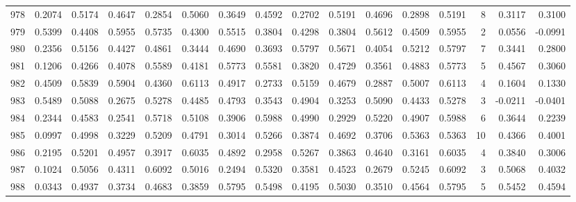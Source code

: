 \begin{tabular}{lrrrrrrrrrrrrrrr}
978 &      0.2074 &  0.5174 &  0.4647 &  0.2854 &  0.5060 &  0.3649 &  0.4592 &  0.2702 &  0.5191 &  0.4696 &   0.2898 &     0.5191 &      8 &                    0.3117 &                     0.3100 \\
979 &      0.5399 &  0.4408 &  0.5955 &  0.5735 &  0.4300 &  0.5515 &  0.3804 &  0.4298 &  0.3804 &  0.5612 &   0.4509 &     0.5955 &      2 &                    0.0556 &                    -0.0991 \\
980 &      0.2356 &  0.5156 &  0.4427 &  0.4861 &  0.3444 &  0.4690 &  0.3693 &  0.5797 &  0.5671 &  0.4054 &   0.5212 &     0.5797 &      7 &                    0.3441 &                     0.2800 \\
981 &      0.1206 &  0.4266 &  0.4078 &  0.5589 &  0.4181 &  0.5773 &  0.5581 &  0.3820 &  0.4729 &  0.3561 &   0.4883 &     0.5773 &      5 &                    0.4567 &                     0.3060 \\
982 &      0.4509 &  0.5839 &  0.5904 &  0.4360 &  0.6113 &  0.4917 &  0.2733 &  0.5159 &  0.4679 &  0.2887 &   0.5007 &     0.6113 &      4 &                    0.1604 &                     0.1330 \\
983 &      0.5489 &  0.5088 &  0.2675 &  0.5278 &  0.4485 &  0.4793 &  0.3543 &  0.4904 &  0.3253 &  0.5090 &   0.4433 &     0.5278 &      3 &                   -0.0211 &                    -0.0401 \\
984 &      0.2344 &  0.4583 &  0.2541 &  0.5718 &  0.5108 &  0.3906 &  0.5988 &  0.4990 &  0.2929 &  0.5220 &   0.4907 &     0.5988 &      6 &                    0.3644 &                     0.2239 \\
985 &      0.0997 &  0.4998 &  0.3229 &  0.5209 &  0.4791 &  0.3014 &  0.5266 &  0.3874 &  0.4692 &  0.3706 &   0.5363 &     0.5363 &     10 &                    0.4366 &                     0.4001 \\
986 &      0.2195 &  0.5201 &  0.4957 &  0.3917 &  0.6035 &  0.4892 &  0.2958 &  0.5267 &  0.3863 &  0.4640 &   0.3161 &     0.6035 &      4 &                    0.3840 &                     0.3006 \\
987 &      0.1024 &  0.5056 &  0.4311 &  0.6092 &  0.5016 &  0.2494 &  0.5320 &  0.3581 &  0.4523 &  0.2679 &   0.5245 &     0.6092 &      3 &                    0.5068 &                     0.4032 \\
988 &      0.0343 &  0.4937 &  0.3734 &  0.4683 &  0.3859 &  0.5795 &  0.5498 &  0.4195 &  0.5030 &  0.3510 &   0.4564 &     0.5795 &      5 &                    0.5452 &                     0.4594 \\

\end{tabular}
